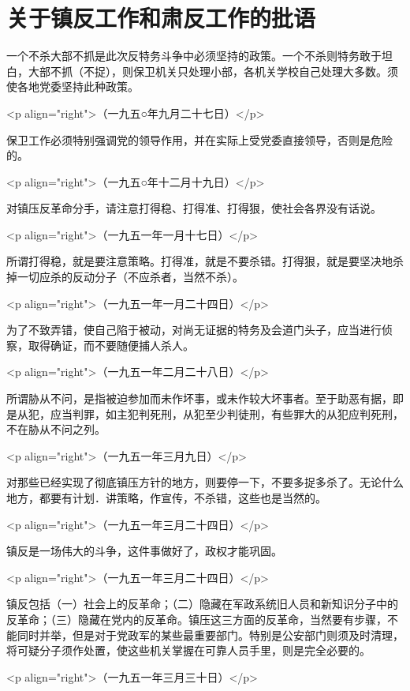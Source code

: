 \section[关于镇反工作和肃反工作的批语（一九四三年十月九日）]{关于镇反工作和肃反工作的批语}


一个不杀大部不抓是此次反特务斗争中必须坚持的政策。一个不杀则特务敢于坦白，大部不抓（不捉），则保卫机关只处理小部，各机关学校自己处理大多数。须使各地党委坚持此种政策。

<p align="right">（一九五○年九月二十七日）</p>

保卫工作必须特别强调党的领导作用，并在实际上受党委直接领导，否则是危险的。

<p align="right">（一九五○年十二月十九日）</p>

对镇压反革命分手，请注意打得稳、打得准、打得狠，使社会各界没有话说。

<p align="right">（一九五一年一月十七日）</p>

所谓打得稳，就是要注意策略。打得准，就是不要杀错。打得狠，就是要坚决地杀掉一切应杀的反动分子（不应杀者，当然不杀）。

<p align="right">（一九五一年一月二十四日）</p>

为了不致弄错，使自己陷于被动，对尚无证据的特务及会道门头子，应当进行侦察，取得确证，而不要随便捕人杀人。

<p align="right">（一九五一年二月二十八日）</p>

所谓胁从不问，是指被迫参加而未作坏事，或未作较大坏事者。至于助恶有据，即是从犯，应当判罪，如主犯判死刑，从犯至少判徒刑，有些罪大的从犯应判死刑，不在胁从不问之列。

<p align="right">（一九五一年三月九日）</p>

对那些已经实现了彻底镇压方针的地方，则要停一下，不要多捉多杀了。无论什么地方，都要有计划．讲策略，作宣传，不杀错，这些也是当然的。

<p align="right">（一九五一年三月二十四日）</p>

镇反是一场伟大的斗争，这件事做好了，政权才能巩固。

<p align="right">（一九五一年三月二十四日）</p>

镇反包括（一）社会上的反革命；（二）隐藏在军政系统旧人员和新知识分子中的反革命；（三）隐藏在党内的反革命。镇压这三方面的反革命，当然要有步骤，不能同时并举，但是对于党政军的某些最重要部门。特别是公安部门则须及时清理，将可疑分子须作处置，使这些机关掌握在可靠人员手里，则是完全必要的。

<p align="right">（一九五一年三月三十日）</p>

